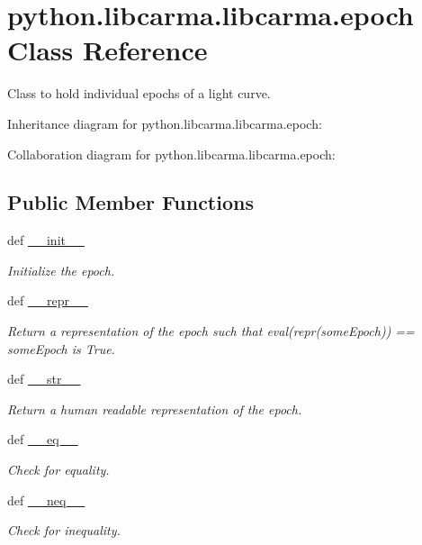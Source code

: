 \hypertarget{classpython_1_1libcarma_1_1libcarma_1_1epoch}{\section{python.\-libcarma.\-libcarma.\-epoch Class Reference}
\label{classpython_1_1libcarma_1_1libcarma_1_1epoch}
}


Class to hold individual epochs of a light curve.  




Inheritance diagram for python.\-libcarma.\-libcarma.\-epoch\-:


Collaboration diagram for python.\-libcarma.\-libcarma.\-epoch\-:
\subsection*{Public Member Functions}
\begin{DoxyCompactItemize}
\item 
def \hyperlink{classpython_1_1libcarma_1_1libcarma_1_1epoch_a1f88fa3464ccd95b3ebebeb6a0b0e075}{\-\_\-\-\_\-init\-\_\-\-\_\-}
\begin{DoxyCompactList}\small\item\em Initialize the epoch. \end{DoxyCompactList}\item 
def \hyperlink{classpython_1_1libcarma_1_1libcarma_1_1epoch_a3538e212898c02622a6d57c770efa4ca}{\-\_\-\-\_\-repr\-\_\-\-\_\-}
\begin{DoxyCompactList}\small\item\em Return a representation of the epoch such that eval(repr(some\-Epoch)) == some\-Epoch is True. \end{DoxyCompactList}\item 
def \hyperlink{classpython_1_1libcarma_1_1libcarma_1_1epoch_ab02920b5bb505737f20f21468187f98a}{\-\_\-\-\_\-str\-\_\-\-\_\-}
\begin{DoxyCompactList}\small\item\em Return a human readable representation of the epoch. \end{DoxyCompactList}\item 
def \hyperlink{classpython_1_1libcarma_1_1libcarma_1_1epoch_a1fd52b701f3c509ee5f0bd9f2431db17}{\-\_\-\-\_\-eq\-\_\-\-\_\-}
\begin{DoxyCompactList}\small\item\em Check for equality. \end{DoxyCompactList}\item 
def \hyperlink{classpython_1_1libcarma_1_1libcarma_1_1epoch_a60115d2de2854aece68302e699ea0aae}{\-\_\-\-\_\-neq\-\_\-\-\_\-}
\begin{DoxyCompactList}\small\item\em Check for inequality. \end{DoxyCompactList}\end{DoxyCompactItemize}
